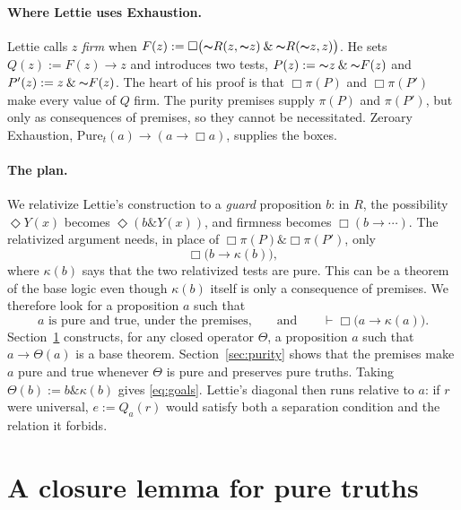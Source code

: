 \documentclass[12pt,leqno]{article}
\newcommand{\AND}{\ensuremath{\mathbin{\&}}}
\newcommand{\IC}{\ensuremath{\rightarrow}}
\newcommand{\NOT}{\ensuremath{\text{$\thicksim$}}}
\newcommand{\dentails}{\ensuremath{\vdash}}
\newcommand{\Pure}{\ensuremath{\mathrm{Pure}}}
\theoremstyle{plain}
\begin{document}
\paragraph{Where Lettie uses Exhaustion.}
Lettie calls \(z\) \emph{firm} when
\(F(z):=\Box\bigl(\NOT R(z,\NOT z)\AND\NOT R(\NOT z,z)\bigr)\). He sets
\(Q(z):=F(z)\IC z\) and introduces two tests,
\(P(z):=\NOT z\AND\NOT F(z)\) and \(P'(z):=z\AND\NOT F(z)\). The heart
of his proof is that \(\Box\pi(P)\) and \(\Box\pi(P')\) make every value
of \(Q\) firm. The purity premises supply \(\pi(P)\) and \(\pi(P')\),
but only as consequences of premises, so they cannot be necessitated.
Zeroary Exhaustion, \(\Pure_t(a)\IC(a\IC\Box a)\), supplies the boxes.

\paragraph{The plan.}
We relativize Lettie's construction to a \emph{guard} proposition \(b\):
in \(R\), the possibility \(\Diamond Y(x)\) becomes
\(\Diamond(b\AND Y(x))\), and firmness becomes
\(\Box(b\IC\cdots)\). The relativized argument needs, in place of
\(\Box\pi(P)\AND\Box\pi(P')\), only
\[
 \Box\bigl(b\IC\kappa(b)\bigr),
\]
where \(\kappa(b)\) says that the two relativized tests are pure.
This can be a theorem of the base logic even though \(\kappa(b)\) itself
is only a consequence of premises. We therefore look for a proposition
\(a\) such that
\begin{equation}
 \text{\(a\) is pure and true, under the premises,}
 \qquad\text{and}\qquad
 \dentails\Box\bigl(a\IC\kappa(a)\bigr).
 \label{eq:goals}
\end{equation}
Section~\ref{sec:closure} constructs, for any closed operator \(\Theta\),
a proposition \(a\) such that \(a\IC\Theta(a)\) is a base theorem.
Section~\ref{sec:purity} shows that the premises make \(a\) pure and
true whenever \(\Theta\) is pure and preserves pure truths. Taking \(\Theta(b):=b\AND\kappa(b)\)
gives \eqref{eq:goals}. Lettie's diagonal then runs relative to \(a\):
if \(r\) were universal, \(e:=Q_a(r)\) would satisfy both a separation
condition and the relation it forbids.

\section{A closure lemma for pure truths}\label{sec:closure}
\end{document}
